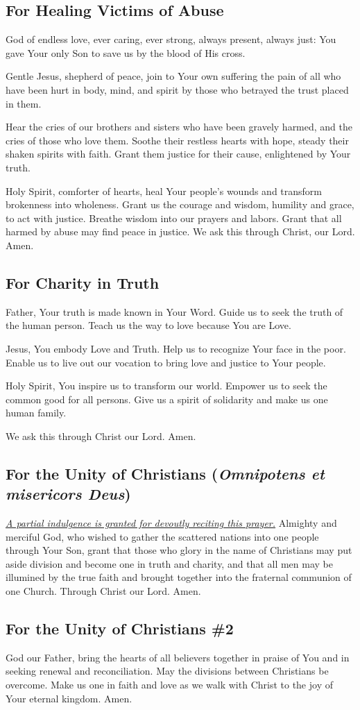 \documentclass[12pt]{article}
\newcommand{\prayertitle}[1]{\subsection{#1}}
\newcommand{\indulgencedprayertitle}[1]{\prayertitle{#1 \protect\kreuz}}
\newcommand{\foreign}[1]{\textsl{#1}}
\newcommand{\note}[1]{{\small{\textsl{#1}}}\newline}
\newcommand{\linkednote}[2]{\hyperlink{#1}{\note{#2}}}
\begin{document}
\prayertitle{For Healing Victims of Abuse}
\label{prayer:healing_victims_abuse}
God of endless love, ever caring, ever strong, always present, always just:
You gave Your only Son to save us by the blood of His cross.

Gentle Jesus, shepherd of peace, join to Your own suffering the pain of all who have been hurt in body, mind, and spirit by those who betrayed the trust placed in them.

Hear the cries of our brothers and sisters who have been gravely harmed, and the cries of those who love them.
Soothe their restless hearts with hope, steady their shaken spirits with faith.
Grant them justice for their cause, enlightened by Your truth.

Holy Spirit, comforter of hearts, heal Your people's wounds and transform brokenness into wholeness.
Grant us the courage and wisdom, humility and grace, to act with justice.
Breathe wisdom into our prayers and labors.
Grant that all harmed by abuse may find peace in justice.
We ask this through Christ, our Lord. Amen.

\prayertitle{For Charity in Truth}
\label{prayer:charity_truth}
Father, Your truth is made known in Your Word.
Guide us to seek the truth of the human person.
Teach us the way to love because You are Love.

Jesus, You embody Love and Truth.
Help us to recognize Your face in the poor.
Enable us to live out our vocation to bring love and justice to Your people.

Holy Spirit, You inspire us to transform our world.
Empower us to seek the common good for all persons.
Give us a spirit of solidarity and make us one human family.

We ask this through Christ our Lord. Amen.

\indulgencedprayertitle{For the Unity of Christians (\foreign{Omnipotens et misericors Deus})}
\linkednote{grant11}{A partial indulgence is granted for devoutly reciting this prayer.}
Almighty and merciful God, who wished to gather the scattered nations into one people
through Your Son, grant that those who glory in the name of Christians may put aside
division and become one in truth and charity, and that all men may be illumined by the
true faith and brought together into the fraternal communion of one Church.
Through Christ our Lord. Amen.

\prayertitle{For the Unity of Christians \#2}
God our Father, bring the hearts of all believers together in praise of You and in seeking renewal and reconciliation.
May the divisions between Christians be overcome.
Make us one in faith and love as we walk with Christ to the joy of Your eternal kingdom.
Amen.
\end{document}
